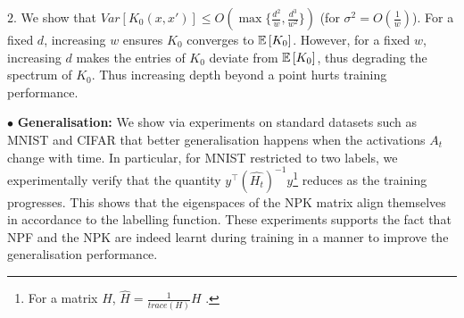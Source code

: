 \documentclass{article}
\begin{document}
$2.$ We show that $Var\left[K_0(x,x')\right]\leq O(\max\{\frac{d^2}{w}, \frac{d^3}{w^2}\})$ (for $\sigma^2=O(\frac{1}w)$). For a fixed $d$, increasing $w$ ensures $K_0$ converges to $\mathbb{E}\left[K_0\right]$. However, for a fixed $w$, increasing $d$ makes the entries of $K_0$ deviate from $\mathbb{E}\left[K_0\right]$, thus degrading the spectrum of $K_0$. Thus increasing depth beyond a point hurts training performance.
\begin{comment}
$\bullet$ \textbf{Feature Learning:} To the best of our knowledge, for the first time in the literature, we concretely identify that the gradient flow in a DNN has two components. The $\phi^\top_{x_s,t} {\partial} v_t $ term, which we call the \emph{value gradient}, learns the path values (which are akin to weight vector in a standard linear approximation) keeping the NPFs fixed. The $ {\partial} \phi^\top_{x_s,t} v_t$ term, which we call the \emph{feature gradient} learns the NPFs keeping the path values fixed. We further note that, in $\phi_{x,t}/H_t$, only $A_t/\lambda_t$ changes during training. %
\end{comment}

$\bullet$ \textbf{Generalisation:} We show via experiments on standard datasets such as MNIST and CIFAR that better generalisation happens when the activations $A_t$ change with time. In particular, for MNIST restricted to two labels, we experimentally verify that the quantity $y^\top (\widehat{H_t})^{-1}y$\footnote{For a matrix $H$, $\hat{H}=\frac{1}{trace(H)}H$ .} reduces as the training progresses. This shows that the eigenspaces of the NPK matrix align themselves in accordance to the labelling function. These experiments supports the fact that NPF and the NPK are indeed learnt during training in a manner to improve the generalisation performance. 
\end{document}
